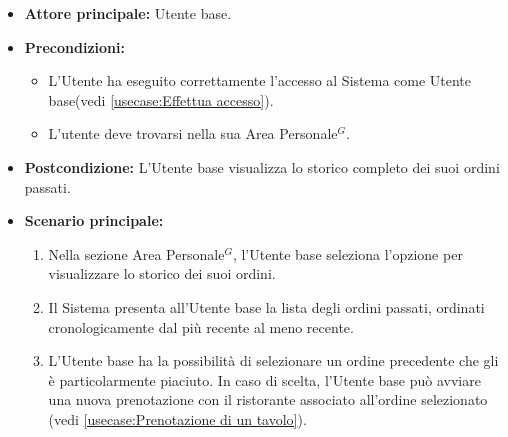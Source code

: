 \label{usecase:Storico ordini}
\begin{itemize}
	\item \textbf{Attore principale:} Utente base.

	\item \textbf{Precondizioni:}
	\begin{itemize}
        \item L'Utente ha eseguito correttamente l'accesso al Sistema come Utente base(vedi \autoref{usecase:Effettua accesso}).
        \item L'utente deve trovarsi nella sua Area Personale$^G$.
    \end{itemize}

	\item \textbf{Postcondizione:} L'Utente base visualizza lo storico completo dei suoi ordini passati.

	\item \textbf{Scenario principale:}
	      \begin{enumerate}
		      \item Nella sezione Area Personale$^G$, l'Utente base seleziona l'opzione per visualizzare lo storico dei suoi ordini.
		      \item Il Sistema presenta all'Utente base la lista degli ordini passati, ordinati cronologicamente dal più recente al meno recente.
              \item L'Utente base ha la possibilità di selezionare un ordine precedente che gli è particolarmente piaciuto.
			  		In caso di scelta, l'Utente base può avviare una nuova prenotazione con il ristorante associato all'ordine selezionato (vedi \autoref{usecase:Prenotazione di un tavolo}).
	      \end{enumerate}
\end{itemize}

